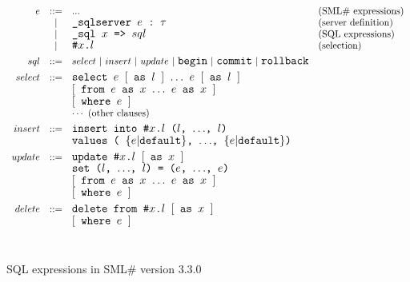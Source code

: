 \documentclass{jbook}
\newcommand{\txt}[2]{#2}
\newcommand{\smlsharp}{SML\#}
\newcommand{\version}{3.3.0}
\newcommand{\code}[1]{\mbox{\large\tt #1}}
\newcommand{\vbar}{\mbox{\ $|$\ }}
\begin{document}
\begin{figure}
\begin{center}
\[
\begin{array}{rcll}
  e &::=& ... & \mbox{(\smlsharp{} expressions)}
\\  &|& \code{\_sqlserver $e$~:~$\tau$} 
	& \mbox{(server definition)}
\\  &|& \code{\_sql $x$ => $sql$} 
	& \mbox{(SQL expressions)}
\\  &|& \code{\#$x$.$l$}
	& \mbox{(selection)}
\\[1ex]
  sql &::=& select
\vbar insert
\vbar update
\vbar \code{begin}
\vbar \code{commit}
\vbar \code{rollback}
\\[1ex]
select &::=& 
     \code{select $e$ $[$ as $l$ $]$ $\ldots$ $e$ $[$ as $l$ $]$}
\\&& \code{$[$ from $e$ as $x$ $\ldots$ $e$ as $x$ $]$}
\\&& \code{$[$ where $e$ $]$}
\\&& \cdots\ \mbox{(other clauses)}
\\[1ex]
insert &::=& 
\code{insert into \#$x$.$l$ ($l$, $\ldots$, $l$)}
\\&& \code{values ( $\{e|$default$\}$, $\ldots$, $\{e|$default$\}$)}
\\[1ex]
update &::=& 
   \code{update \#$x$.$l$ $[$ as $x$ $]$}
\\&& \code{set ($l$, $\ldots$, $l$) = ($e$, $\ldots$, $e$)}
\\&& \code{$[$ from $e$ as $x$ $\ldots$ $e$ as $x$ $]$}
\\&& \code{$[$ where $e$ $]$}
\\[1ex]
delete &::=& 
   \code{delete from \#$x$.$l$ $[$ as $x$ $]$}
\\&& \code{$[$ where $e$ $]$}
\end{array}
\]
\ \\
\caption{\txt{\smlsharp{}第\version{}版のSQL構文概要}{SQL expressions in \smlsharp{} version \version{}}}
\end{center}
\label{fig:sqlSyntax}
\end{figure}
\end{document}
